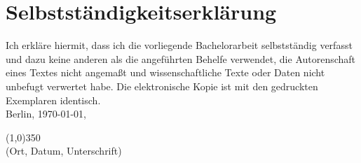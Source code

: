 \section*{Selbstständigkeitserklärung}\label{sec:selbststandigkeitserklarung}
Ich erkläre hiermit, dass ich die vorliegende Bachelorarbeit selbstständig verfasst und dazu  keine  anderen  als  die  angeführten  Behelfe  verwendet,  die  Autorenschaft  eines Textes  nicht  angemaßt  und  wissenschaftliche  Texte  oder  Daten  nicht  unbefugt verwertet habe. Die elektronische Kopie ist mit den gedruckten Exemplaren identisch.
\vspace{5cm}
\\

Berlin, \today, 
\begin{flushleft}
	\line(1,0){350}\\
	(Ort, Datum, Unterschrift)
\end{flushleft}